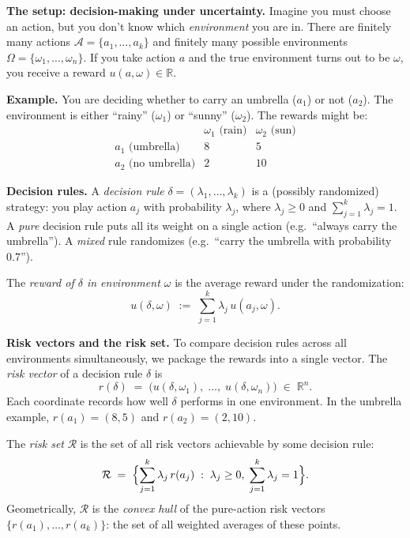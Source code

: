 \documentclass[11pt]{article}
\begin{document}
\begin{exercise}
\label{ex:complete-class}
\noindent
\textbf{The setup: decision-making under uncertainty.} Imagine you must choose an
action, but you don't know which \emph{environment} you are in. There are finitely
many actions $\mathcal{A} = \{a_1, \ldots, a_k\}$ and finitely many possible
environments $\Omega = \{\omega_1, \ldots, \omega_n\}$. If you take action $a$ and the
true environment turns out to be $\omega$, you receive a reward
$u(a, \omega) \in \mathbb{R}$.

\medskip
\noindent
\textbf{Example.} You are deciding whether to carry an umbrella ($a_1$) or not
($a_2$). The environment is either ``rainy'' ($\omega_1$) or ``sunny'' ($\omega_2$).
The rewards might be:
\[
\begin{array}{c|cc}
 & \omega_1 \text{ (rain)} & \omega_2 \text{ (sun)} \\
\hline
a_1 \text{ (umbrella)} & 8 & 5 \\
a_2 \text{ (no umbrella)} & 2 & 10
\end{array}
\]

\medskip
\noindent
\textbf{Decision rules.} A \emph{decision rule}
$\delta = (\lambda_1, \ldots, \lambda_k)$ is a (possibly randomized) strategy: you
play action $a_j$ with probability $\lambda_j$, where $\lambda_j \geq 0$ and
$\sum_{j=1}^k \lambda_j = 1$. A \emph{pure} decision rule puts all its weight on a
single action (e.g.\ ``always carry the umbrella''). A \emph{mixed} rule randomizes
(e.g.\ ``carry the umbrella with probability $0.7$'').

\medskip
\noindent
The \emph{reward of $\delta$ in environment $\omega$} is the average reward under
the randomization:
\[
  u(\delta, \omega) \;:=\; \sum_{j=1}^k \lambda_j\, u(a_j, \omega).
\]

\medskip
\noindent
\textbf{Risk vectors and the risk set.} To compare decision rules across all
environments simultaneously, we package the rewards into a single vector. The
\emph{risk vector} of a decision rule $\delta$ is
\[
  r(\delta) \;=\; \bigl(u(\delta, \omega_1),\; \ldots,\; u(\delta, \omega_n)\bigr)
  \;\in\; \mathbb{R}^n.
\]
Each coordinate records how well $\delta$ performs in one environment. In the umbrella
example, $r(a_1) = (8, 5)$ and $r(a_2) = (2, 10)$.

\medskip
\noindent
The \emph{risk set} $\mathcal{R}$ is the set of all risk vectors achievable by some
decision rule:
\[
  \mathcal{R} \;=\; \Bigl\{\sum_{j=1}^k \lambda_j\, r(a_j) \;:\;
  \lambda_j \geq 0,\; \sum_{j=1}^k \lambda_j = 1\Bigr\}.
\]
Geometrically, $\mathcal{R}$ is the \emph{convex hull} of the pure-action risk
vectors $\{r(a_1), \ldots, r(a_k)\}$: the set of all weighted averages of these
points.


\end{exercise}
\end{document}

